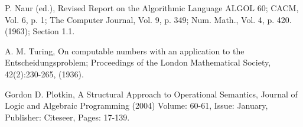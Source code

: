 \begin{thebibliography}{99}


P. Naur (ed.), Revised Report on the Algorithmic Language ALGOL 60; CACM, Vol.
6, p. 1; The Computer Journal, Vol. 9, p. 349; Num. Math., Vol. 4, p. 420.
(1963); Section 1.1.


A. M. Turing, On computable numbers with an application to the
Entscheidungsproblem; Proceedings of the London Mathematical Society,
42(2):230-265, (1936).


Gordon D. Plotkin, A Structural Approach to Operational Semantics, Journal of
Logic and Algebraic Programming (2004) Volume: 60-61, Issue: January,
Publisher: Citeseer, Pages: 17-139.

\end{thebibliography}
